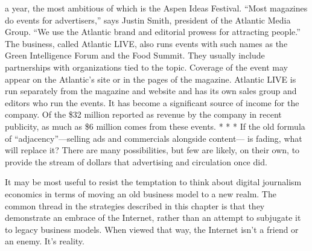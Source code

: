 a year, the most ambitious of which is the Aspen Ideas Festival. ``Most magazines
do events for advertisers,'' says Justin Smith, president of the Atlantic Media
Group. ``We use the Atlantic brand and editorial prowess for attracting people.''
The business, called Atlantic LIVE, also runs events with such names as the Green
Intelligence Forum and the Food Summit. They usually include partnerships
with organizations tied to the topic. Coverage of the event may appear on the
Atlantic’s site or in the pages of the magazine.
Atlantic LIVE is run separately from the magazine and website and has its own
sales group and editors who run the events. It has become a significant source of
income for the company. Of the \$32 million reported as revenue by the company
in recent publicity, as much as \$6 million comes from these events.
* * *
If the old formula of ``adjacency''—selling ads and commercials alongside content—
is fading, what will replace it? There are many possibilities, but few are
likely, on their own, to provide the stream of dollars that advertising and circulation
once did.

It may be most useful to resist the temptation to think about digital journalism
economics in terms of moving an old business model to a new realm. The
common thread in the strategies described in this chapter is that they demonstrate
an embrace of the Internet, rather than an attempt to subjugate it to
legacy business models.
When viewed that way, the Internet isn’t a friend or an enemy. It’s reality.



